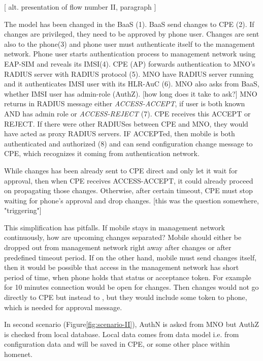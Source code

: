 \documentclass[12pt,a4paper,english]{tutthesis}
\begin{document}
[ alt. presentation of flow number II, paragraph ] 

The model has been changed in the BaaS (1). BaaS send changes to CPE
(2).  If changes are privileged, they need to be approved by phone
user.  Changes are sent also to the phone(3) and phone user must
authenticate itself to the management network.  Phone user starts
authentication process to management network using EAP-SIM and reveals
its IMSI(4).  CPE (AP) forwards authentication to MNO's RADIUS server
with RADIUS protocol (5).  MNO have RADIUS server running and it
authenticates IMSI user with its HLR-AuC (6).  MNO also asks from
BaaS, whether IMSI user has admin-role (AuthZ). [how long does it take
to ask?]  MNO returns in RADIUS message either \emph{ACCESS-ACCEPT}, if
user is both known AND has admin role or \emph{ACCESS-REJECT} (7).  CPE
receives this ACCEPT or REJECT. If there were other RADIUSes between
CPE and MNO, they would have acted as proxy RADIUS servers.  IF
ACCEPTed, then mobile is both authenticated and authorized (8) and can
send configuration change message to CPE, which recognizes it coming
from authentication network.

While changes has been already sent to CPE direct and only let it
wait for approval, then when CPE receives ACCESS-ACCEPT, it could
already proceed on propagating those
changes.  Otherwise, after certain timeout, CPE must stop waiting
for phone's approval and drop changes. [this was the question
somewhere, "triggering"]


This simplification has pitfalls. If mobile stays in management
network continuously, how are upcoming changes separated? Mobile should
either be dropped out from management network right away after changes or
after predefined timeout period.  If on the other hand, mobile must
send changes itself, then it would be possible that access in the
management network has short period of time, when phone 
holds that status or acceptance token. For example for 10 minutes connection
would be open for changes. Then changes would not go directly to CPE
but instead to , but they would include some token to phone, which is
needed for approval message.


\label{scenario-ii}

In second scenario (Figure\ref{fig:scenario-II}), AuthN is asked from MNO but
AuthZ is checked from local database. Local data comes from data model
i.e. from configuration data and will be saved in CPE, or some other
place within homenet.
\end{document}
